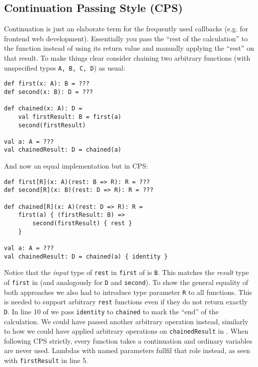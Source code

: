 \subsection{Continuation Passing Style (CPS)} \label{sec:cps}

Continuation is just an elaborate term for the frequently used callbacks (e.g. for frontend web development). Essentially you pass the ``rest of the calculation'' to the function instead of using its return value and manually applying the ``rest'' on that result. To make things clear consider chaining two arbitrary functions (with unspecified types \lstinline{A, B, C, D}) as usual:
\begin{lstlisting}[caption={Ordinary chaining}, label={lst:ordinaryChaining}]
def first(x: A): B = ???
def second(x: B): D = ???

def chained(x: A): D =
    val firstResult: B = first(a)
    second(firstResult)

val a: A = ???
val chainedResult: D = chained(a)

\end{lstlisting}
And now an equal implementation but in CPS:
\begin{lstlisting}[caption={CPS chaining}, label={lst:cpsChaining}]
def first[R](x: A)(rest: B => R): R = ???
def second[R](x: B)(rest: D => R): R = ???

def chained[R](x: A)(rest: D => R): R =
    first(a) { (firstResult: B) => 
        second(firstResult) { rest }
    }    
    
val a: A = ???
val chainedResult: D = chained(a) { identity }
\end{lstlisting}
Notice that the \emph{input} type of \lstinline{rest} in \lstinline{first} of  is \lstinline{B}. This matches the \emph{result} type of \lstinline{first} in  (and analogously for \lstinline{D} and \lstinline{second}). To show the general equality of both approaches we also had to introduce type parameter \lstinline{R} to all functions. This is needed to support arbitrary \lstinline{rest} functions even if they do not return exactly \lstinline{D}. In line 10 of  we pass \lstinline{identity} to \lstinline{chained} to mark the ``end'' of the calculation. We could have passed another arbitrary operation instead, similarly to how we could have applied arbitrary operations on \lstinline{chainedResult} in . When following CPS strictly, every function takes a continuation and ordinary variables are never used. Lambdas with named parameters fullfil that role instead, as seen with \lstinline{firstResult} in line 5.

